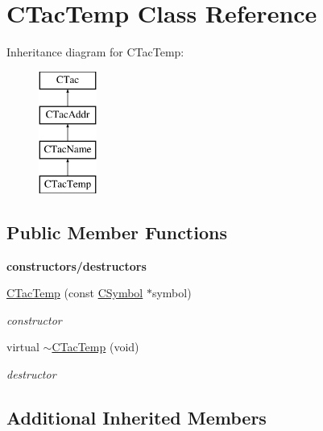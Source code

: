\hypertarget{classCTacTemp}{\section{C\-Tac\-Temp Class Reference}
\label{classCTacTemp}
}
Inheritance diagram for C\-Tac\-Temp\-:\begin{figure}[H]
\begin{center}
\leavevmode
\includegraphics[height=4.000000cm]{classCTacTemp}
\end{center}
\end{figure}
\subsection*{Public Member Functions}
\begin{Indent}{\bf constructors/destructors}\par
\begin{DoxyCompactItemize}
\item 
\hyperlink{classCTacTemp_aba520c3e7d095e6b24cc99610a3b3a5a}{C\-Tac\-Temp} (const \hyperlink{classCSymbol}{C\-Symbol} $\ast$symbol)
\begin{DoxyCompactList}\small\item\em constructor \end{DoxyCompactList}\item 
\hypertarget{classCTacTemp_a42f041d10a4b18b8303905f8323082d4}{virtual \hyperlink{classCTacTemp_a42f041d10a4b18b8303905f8323082d4}{$\sim$\-C\-Tac\-Temp} (void)}\label{classCTacTemp_a42f041d10a4b18b8303905f8323082d4}

\begin{DoxyCompactList}\small\item\em destructor \end{DoxyCompactList}\end{DoxyCompactItemize}
\end{Indent}
\subsection*{Additional Inherited Members}


